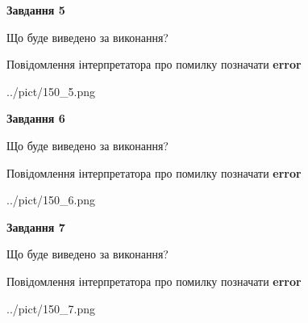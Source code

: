 \documentclass[10pt, ukrainian]{article}
\begin{document}
{\begin {large}
{\begin {center}\textbf{Завдання 5}\end {center}}\par
Що буде виведено за виконання? \par
Повідомлення інтерпретатора про помилку позначати \textbf{error}

\begin{center}
	{../pict/150_5.png}
\end{center}
\newpage

{\begin {center}\textbf{Завдання 6}\end {center}}\par
Що буде виведено за виконання? \par
Повідомлення інтерпретатора про помилку позначати \textbf{error}

\begin{center}
	{../pict/150_6.png}
\end{center}
\newpage

{\begin {center}\textbf{Завдання 7}\end {center}}\par
Що буде виведено за виконання? \par
Повідомлення інтерпретатора про помилку позначати \textbf{error}

\begin{center}
	{../pict/150_7.png}
\end{center}
\newpage

\end {large}}
\end{document}
